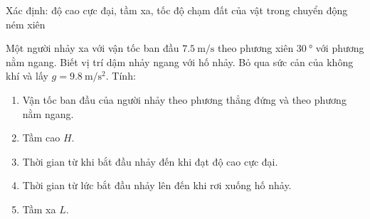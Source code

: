 \begin{dang}{Xác định: độ cao cực đại, tầm xa, tốc độ chạm đất của vật trong chuyển động ném xiên}
	{Một người nhảy xa với vận tốc ban đầu $\SI{7.5}{\meter/\second}$ theo phương xiên $\SI{30}{\degree}$ với phương nằm ngang. Biết vị trí dậm nhảy ngang với hố nhảy. Bỏ qua sức cản của không khí và lấy $g=\SI{9.8}{\meter/\second^2}$. Tính:
		\begin{enumerate}[label= \alph*)]
			\item Vận tốc ban đầu của người nhảy theo phương thẳng đứng và theo phương nằm ngang.
			\item Tầm cao $H$.
			\item Thời gian từ khi bắt đầu nhảy đến khi đạt độ cao cực đại.
			\item Thời gian từ lức bắt đầu nhảy lên đến khi rơi xuống hố nhảy.
			\item Tầm xa $L$.
		\end{enumerate}
	
}
\end{dang}
